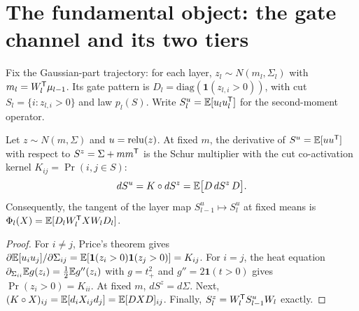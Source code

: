 \maketitle

\section{The fundamental object: the gate channel and its two tiers}
Fix the Gaussian-part trajectory: for each layer, $z_l\sim N(m_l,\Sigma_l)$ with $m_l=W_l^{\mathsf T}\mu_{l-1}$. Its gate
pattern is $D_l=\mathrm{diag}(\mathbf 1(z_{l,i}>0))$, with cut $S_l=\{i:z_{l,i}>0\}$ and law $p_l(S)$. Write
$S^u_l=\mathbb{E}[u_lu_l^{\mathsf T}]$ for the second-moment operator.

\begin{theorem}\label{thm:price}
Let $z\sim N(m,\Sigma)$ and $u=\operatorname{relu}(z)$. At fixed $m$, the derivative of $S^u=\mathbb{E}[uu^{\mathsf T}]$ with respect to
$S^z=\Sigma+mm^{\mathsf T}$ is the Schur multiplier with the cut co-activation kernel $K_{ij}=\Pr(i,j\in S)$:
\[
dS^u=K\circ dS^z=\mathbb{E}\big[D\,dS^z\,D\big].
\]
Consequently, the tangent of the layer map $S^u_{l-1}\mapsto S^u_l$ at fixed means is
$\Phi_l(X)=\mathbb{E}[D_lW_l^{\mathsf T} XW_lD_l]$.
\end{theorem}
\begin{proof}
For $i\neq j$, Price's theorem gives $\partial\mathbb{E}[u_iu_j]/\partial\Sigma_{ij}=\mathbb{E}[\mathbf 1(z_i>0)\mathbf 1(z_j>0)]=K_{ij}$.
For $i=j$, the heat equation $\partial_{\Sigma_{ii}}\mathbb{E} g(z_i)=\tfrac12\mathbb{E} g''(z_i)$ with $g=t_+^2$ and $g''=2\mathbf 1(t>0)$
gives $\Pr(z_i>0)=K_{ii}$. At fixed $m$, $dS^z=d\Sigma$. Next, $(K\circ X)_{ij}=\mathbb{E}[d_iX_{ij}d_j]=\mathbb{E}[DXD]_{ij}$. Finally,
$S^z_l=W_l^{\mathsf T} S^u_{l-1}W_l$ exactly.
\end{proof}

